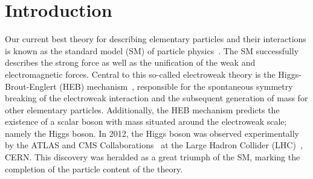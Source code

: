\chapter{Introduction}
\label{chap:intro}



Our current best theory for describing elementary particles and their interactions is known as the standard model (SM) of particle physics~\cite{Glashow:1961tr,Weinberg:1967tq,Salam:1968rm}. 
The SM successfully describes the strong force as well as the unification of the weak and electromagnetic forces. Central to this so-called electroweak theory is the Higgs-Brout-Englert (HEB) mechanism~\cite{Englert:1964et,HIGGS1964132,Higgs:1964pj,Guralnik:1964eu,PhysRev.145.1156,PhysRev.155.1554}, responsible for the spontaneous symmetry breaking of the electroweak interaction and the subsequent generation of mass for other elementary particles. Additionally, the HEB mechanism predicts the existence of a scalar boson with mass situated around the electroweak scale; namely the Higgs boson. In 2012, the Higgs boson was observed experimentally~\cite{Aad:2012tfa,Chatrchyan:2012xdj,Chatrchyan:2013lba} by the ATLAS and CMS Collaborations~\cite{Aad:2008zzm,Chatrchyan:2008zzk} at the Large Hadron Collider (LHC)~\cite{1748-0221-3-08-S08001}, CERN. This discovery was heralded as a great triumph of the SM, marking the completion of the particle content of the theory.

